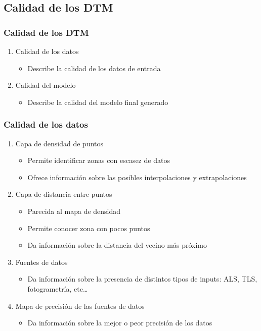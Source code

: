 \subsection[Calidad]{Calidad de los DTM}
\begin{frame}
  \frametitle{Calidad de los DTM}
  \begin{enumerate}
    \item \alert{Calidad de los datos}
      \begin{itemize}
        \item Describe la calidad de los datos de entrada
      \end{itemize}
    \item \alert{Calidad del modelo}
      \begin{itemize}
        \item Describe la calidad del modelo final generado
      \end{itemize}
  \end{enumerate}
\end{frame}
\begin{frame}
  \frametitle{Calidad de los datos}
  \begin{enumerate}
    \item Capa de densidad de puntos
      \begin{itemize}
        \item Permite identificar zonas con escasez de datos
        \item Ofrece información sobre las posibles interpolaciones y
          extrapolaciones
      \end{itemize}
    \item Capa de distancia entre puntos
      \begin{itemize}
        \item Parecida al mapa de densidad
        \item Permite conocer zona con pocos puntos
        \item Da información sobre la distancia del vecino más próximo
      \end{itemize}
    \item Fuentes de datos
      \begin{itemize}
        \item Da información sobre la presencia de distintos tipos de inputs:
          ALS, TLS, fotogrametría, etc\ldots
      \end{itemize}
    \item Mapa de precisión de las fuentes de datos
      \begin{itemize}
        \item Da información sobre la mejor o peor precisión de los datos
      \end{itemize}
  \end{enumerate}
\end{frame}
